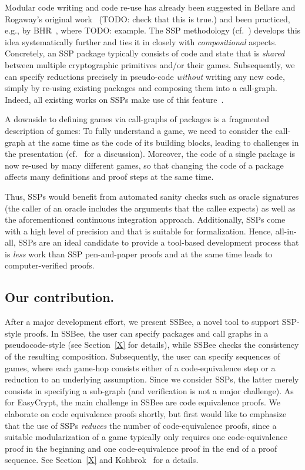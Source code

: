 Modular code writing and code re-use has already been suggested in Bellare and Rogaway's original work~\cite{X} (TODO: check that this is true.) and been practiced, e.g., by BHR~\cite{X}, where TODO: example.
The SSP methodology (cf.~\cite{X,Y,Z}) develops this idea systematically further and ties it in closely with \emph{compositional} aspects. Concretely, an SSP package typically consists of code and state that is \emph{shared} between multiple cryptographic primitives and/or their games. Subsequently, we can specify reductions precisely in pseudo-code \emph{without} writing any new code, simply by re-using existing packages and composing them into a call-graph. Indeed, all existing works on SSPs make use of this feature~\cite{blankedcite}.

A downside to defining games via call-graphs of packages is a fragmented
description of games: To fully understand a game, we need to consider the
call-graph at the same time as the code of its building blocks, leading
to challenges in the presentation (cf.~\cite{ACNS:BEP24} for a discussion).
Moreover, the code of a single package is now re-used by many different games, 
so that changing the code of a package affects many definitions and proof 
steps at the same time.

Thus, SSPs would benefit from automated sanity checks such as oracle signatures
(the caller of an oracle includes the arguments that the callee expects) as
well as the aforementioned continuous integration approach.
Additionally, SSPs come with a high level of precision and
that is suitable for formalization. Hence, all-in-all, SSPs are an ideal
candidate to provide a tool-based development process
that is \emph{less} work than SSP pen-and-paper proofs %
and at the same time leads to computer-verified proofs.


\subsection{Our contribution.} After a major development effort,
we present SSBee, a novel tool to support SSP-style proofs. 
In SSBee, the user can specify packages and call graphs in a 
pseudocode-style (see Section~\ref{X} for details), while SSBee
checks the consistency of the resulting composition. Subsequently,
the user can specify sequences of games, where each game-hop consists
either of a code-equivalence step or a reduction to an underlying
assumption. Since we consider SSPs, the latter merely consists in
specifying a sub-graph (and verification is not a major challenge).
As for EasyCrypt, the main challenge in SSBee are code equivalence proofs.
We elaborate on code equivalence proofs shortly, but first would
like to emphasize that the use of SSPs \emph{reduces} the number
of code-equivalence proofs, since a suitable modularization of a game
typically only requires one code-equivalence proof in the beginning
and one code-equivalence proof in the end of a proof sequence.
See Section~\ref{X} and Kohbrok~\cite{Kohbrok:thesis} for a details.

